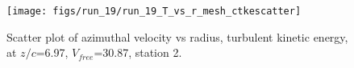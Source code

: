 \begin{figure}[H]
\centering
\texttt{[image: figs/run\_19/run\_19\_T\_vs\_r\_mesh\_ctkescatter]}
\caption{Scatter plot of azimuthal velocity vs radius, turbulent kinetic energy, at $z/c$=6.97, $V_{free}$=30.87, station 2.}
\label{fig:run_19_T_vs_r_mesh_ctkescatter}
\end{figure}


